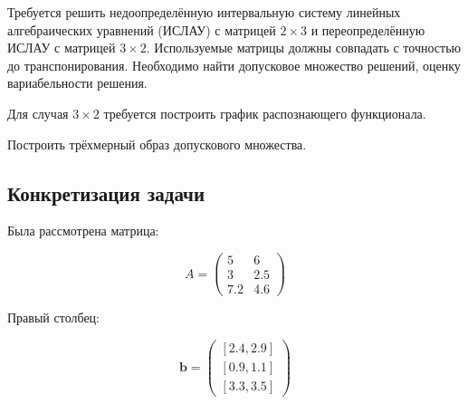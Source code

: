 Требуется решить недоопределённую интервальную систему линейных алгебраических уравнений (ИСЛАУ) с матрицей $2 \times 3$ и переопределённую ИСЛАУ с матрицей $3 \times 2$. Используемые матрицы должны совпадать с точностью до транспонирования. Необходимо найти допусковое множество решений, оценку вариабельности решения.

Для случая $3 \times 2$ требуется построить график распознающего функционала.

Построить трёхмерный образ допускового множества.

\subsection{Конкретизация задачи}

Была рассмотрена матрица:

\begin{equation}
A =
\begin{pmatrix}
5 & 6 \\
3 & 2.5 \\
7.2 & 4.6
\end{pmatrix}
\end{equation}

Правый столбец:

\begin{equation}
\mathbf{b}=
\begin{pmatrix}
[2.4, 2.9] \\
[0.9, 1.1] \\
[3.3, 3.5]
\end{pmatrix}
\end{equation}

